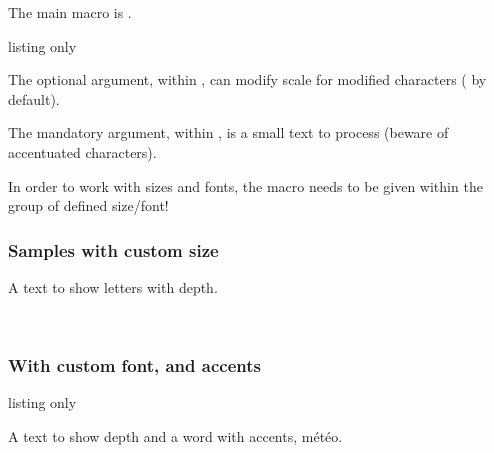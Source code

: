 \documentclass[11pt,a4paper]{ltxdoc}
\newcommand\fontIZ{\fontencoding{T1}\fontfamily{zi4}\fontseries{sb}\selectfont}
\begin{document}
The main macro is \ShowCode{\\nodepth}.

\begin{DemoCode}{listing only}
\end{DemoCode}

The optional argument, within \ShowCode{[...]}, can modify scale for modified characters ( by default).

The mandatory argument, within , is a small text to process (beware of accentuated characters).

\smallskip

In order to work with sizes and fonts, the macro needs to be given within the group of defined size/font!

\subsubsection{Samples with custom size}

\begin{DemoCode}{}
{\Large\ttfamily A text to show letters with depth.}

{\Large\ttfamily{}}\\
{\Large\ttfamily{}}
\end{DemoCode}

\subsubsection{With custom font, and accents}

\begin{DemoCode}{listing only}
\newcommand\fontIZ{\fontencoding{T1}\fontfamily{zi4}\fontseries{sb}\selectfont}
\end{DemoCode}

\begin{DemoCode}{}
{\large\sffamily A text to show depth and a word with accents, météo.}\\

{\large\sffamily{}}\\
{\large\sffamily{}}
\end{DemoCode}
\end{document}
